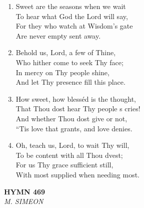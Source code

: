 \documentclass[11pt,a4paper]{article}
\begin{document}
\begin{enumerate}
    \item Sweet are the seasons when we wait \\
        To hear what God the Lord will say, \\
        For they who watch at Wisdom's gate \\
        Are never empty sent away.

    \item Behold us, Lord, a few of Thine, \\
        Who hither come to seek Thy face; \\
        In mercy on Thy people shine, \\
        And let Thy presence fill this place.

    \item How sweet, how blesséd is the thought, \\
        That Thou dost hear Thy people s cries! \\
        And whether Thou dost give or not, \\
        ``Tis love that grants, and love denies.

    \item Oh, teach us, Lord, to wait Thy will, \\
        To be content with all Thou dvest; \\
        For us Thy grace sufficient still, \\
        With most supplied when needing most.

\end{enumerate}

\newpage
\begin{center}
    {\Large \textbf{HYMN 469}}
    \\
    \textit{M. SIMEON}
\end{center}
\vspace{1em}
\end{document}
